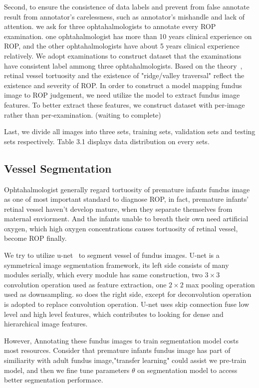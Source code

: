 \documentclass[10pt,twocolumn,letterpaper]{article}
\begin{document}
  Second, to ensure the consistence of data labels and prevent from false annotate result from annotator's carelessness, such as annotator's mishandle and lack of attention. we ask for three ophtahalmologists to annotate every ROP examination. one ophtahalmologist has more than 10 years clinical experience on ROP, and the other ophtahalmologists have about 5 years clinical experience relatively. We adopt examinations to construct dataset that the examinations have consistent label ammong three ophtahalmologists. Based on the theory~\cite{Alpher01}, retinal vessel tortuosity and the existence of "ridge/valley traversal" reflect the existence and severity of ROP. In order to construct a model mapping fundus image to ROP judgement, we need utilize the model to extract fundus image features. To better extract these features, we construct dataset with per-image rather than per-examination. (waiting to complete)

  Last, we divide all images into three sets, training sets, validation sets and testing sets respectively. Table 3.1 displays data distribution on every sets.

\subsection{Vessel Segmentation}
  Ophtahalmologist generally regard tortuosity of premature infants fundus image as one of most important standard to diagnose ROP, in fact, premature infants' retinal vessel haven't develop mature, when they separate themselves from maternal enviorment. And the infants unable to breath their own need artificial oxygen, which high oxygen concentrations  causes tortuosity of retinal vessel, become ROP finally.

  We try to utilize u-net~\cite{02} to segment vessel of fundus images. U-net is a symmetrical image segmentation framework, its left side consists of many modules serially, which every module has same construction, two $3\times3$ convolution operation used as feature extraction, one $2\times2$ max pooling operation used as downsampling. so does the right side, except for deconvolution operation is adopted to replace convolution operation. U-net uses skip connection fuse low level and high level features, which contributes to looking for dense and hierarchical image features.

  However, Annotating these fundus images to train segmentation model costs most resources.
  Consider that premature infants fundus image has part of similiarity with adult fundus image,"transfer learning" could assist we pre-train model, and then we fine tune parameters $\theta$ on segmentation model to access better segmentation performace.
\end{document}
